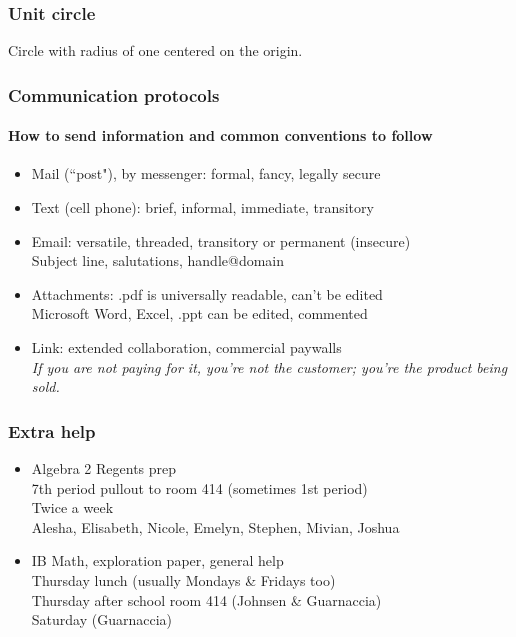 \documentclass{beamer}
\begin{document}
\frame
{
  \frametitle{Unit circle}
  Circle with radius of one centered on the origin.
\begin{center}
\end{center}
 }

\frame
{
  \frametitle{Communication protocols}
  \framesubtitle{How to send information and common conventions to follow}
\begin{itemize}
      \item Mail (``post"), by messenger: formal, fancy, legally secure
      \item Text (cell phone): brief, informal, immediate, transitory
      \item Email: versatile, threaded, transitory or permanent (insecure)\\
      Subject line, salutations, handle@domain
      \item Attachments: .pdf is universally readable, can't be edited\\
      Microsoft Word, Excel, .ppt can be edited, commented
      \item Link: extended collaboration, commercial paywalls\\
      \emph{If you are not paying for it, you're not the customer; you're the product being sold.}
\end{itemize}
 }


\frame
{
  \frametitle{Extra help}
\begin{itemize}
      \item Algebra 2 Regents prep\\
      7th period pullout to room 414 (sometimes 1st period)\\
      Twice a week\\
      Alesha, Elisabeth, Nicole, Emelyn, Stephen, Mivian, Joshua\\[20pt]
      \item IB Math, exploration paper, general help\\
      Thursday lunch (usually Mondays \& Fridays too)\\
      Thursday after school room 414 (Johnsen \& Guarnaccia)\\
      Saturday (Guarnaccia)
\end{itemize}
 }
\end{document}
